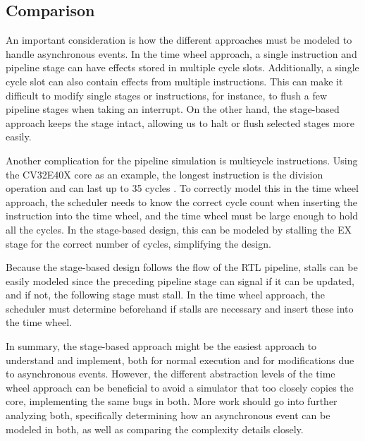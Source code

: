 \subsection{Comparison}
\label{sec:stageWheelComp}

An important consideration is how the different approaches must be modeled to handle asynchronous events. In the time wheel approach, a single instruction and pipeline stage can have effects stored in multiple cycle slots. Additionally, a single cycle slot can also contain effects from multiple instructions. This can make it difficult to modify single stages or instructions, for instance, to flush a few pipeline stages when taking an interrupt.
On the other hand, the stage-based approach keeps the stage intact, allowing us to halt or flush selected stages more easily.

Another complication for the pipeline simulation is multicycle instructions. Using the CV32E40X core as an example, the longest instruction is the division operation and can last up to 35 cycles \cite{openhw_group_pipeline_2023}. To correctly model this in the time wheel approach, the scheduler needs to know the correct cycle count when inserting the instruction into the time wheel, and the time wheel must be large enough to hold all the cycles. In the stage-based design, this can be modeled by stalling the EX stage for the correct number of cycles, simplifying the design. 

Because the stage-based design follows the flow of the RTL pipeline, stalls can be easily modeled since the preceding pipeline stage can signal if it can be updated, and if not, the following stage must stall. In the time wheel approach, the scheduler must determine beforehand if stalls are necessary and insert these into the time wheel.

In summary, the stage-based approach might be the easiest approach to understand and implement, both for normal execution and for modifications due to asynchronous events. However, the different abstraction levels of the time wheel approach can be beneficial to avoid a simulator that too closely copies the core, implementing the same bugs in both. More work should go into further analyzing both, specifically determining how an asynchronous event can be modeled in both, as well as comparing the complexity details closely.





